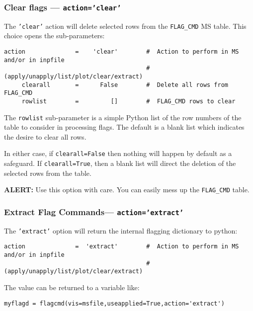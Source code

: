\subsubsection{Clear flags --- {\tt action='clear'}}
\label{section:edit.flagcmd.action.clear}

The {\tt 'clear'} action will delete selected rows from the 
{\tt FLAG\_CMD} MS table.
This choice opens the sub-parameters:
\small
\begin{verbatim}
action              =    'clear'        #  Action to perform in MS and/or in inpfile
                                        #   (apply/unapply/list/plot/clear/extract)
     clearall       =      False        #  Delete all rows from FLAG_CMD
     rowlist        =         []        #  FLAG_CMD rows to clear
\end{verbatim}
\normalsize

The {\tt rowlist} sub-parameter is a simple Python list of the row
numbers of the table to consider in processing flags.  The default is
a blank list which indicates the desire to clear all rows.

In either case, if {\tt clearall=False} then nothing will
happen by default as a safeguard.  If {\tt clearall=True}, then a 
blank list will direct the deletion of the selected rows from the table.

{\bf ALERT:} Use this option with care.  You can easily mess up the
{\tt FLAG\_CMD} table.

\subsubsection{Extract Flag Commands--- {\tt action='extract'}}
\label{section:edit.flagcmd.action.extract}

The {\tt 'extract'} option will return the internal flagging dictionary to
              python:
\small
\begin{verbatim}
action              =  'extract'        #  Action to perform in MS and/or in inpfile
                                        #   (apply/unapply/list/plot/clear/extract)
\end{verbatim}
\normalsize

The value can be returned to a variable like: 

\small
\begin{verbatim}
myflagd = flagcmd(vis=msfile,useapplied=True,action='extract')
\end{verbatim}
\normalsize


